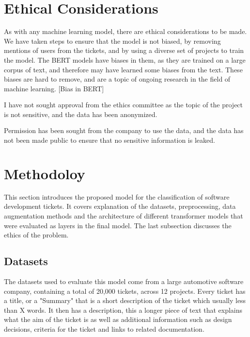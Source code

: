 \documentclass{UoYCSproject}
\begin{document}
    \chapter{Ethical Considerations}
    As with any machine learning model, there are ethical considerations to be made.
    We have taken steps to ensure that the model is not biased, by removing mentions of users from the tickets, and by using a diverse set of projects to train the model.
    The BERT models have biases in them, as they are trained on a large corpus of text, and therefore may have learned some biases from the text.
    These biases are hard to remove, and are a topic of ongoing research in the field of machine learning. [Bias in BERT]

    I have not sought approval from the ethics committee as the topic of the project is not sensitive, and the data has been anonymized.

    Permission has been sought from the company to use the data, and the data has not been made public to ensure that no sensitive information is leaked.


    \chapter{Methodoloy}
    \label{ch:methodology}
    This section introduces the proposed model for the classification of software development tickets.
    It covers explanation of the datasets, preprocessing, data augmentation methods and the architecture of different transformer models that were evaluated as layers in the final model.
    The last subsection discusses the ethics of the problem.


    \section{Datasets}\label{sec:datasets}
    The datasets used to evaluate this model come from a large automotive software company, containing a total of 20,000 tickets, across 12 projects.
    Every ticket has a title, or a "Summary" that is a short description of the ticket which usually less than X words.
    It then has a description, this a longer piece of text that explains what the aim of the ticket is as well as additional information such as design decisions, criteria for the ticket and links to related documentation. \par
\end{document}
